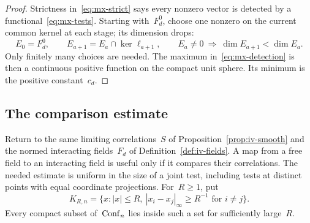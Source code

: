 \begin{proof}
Strictness in~\eqref{eq:mx-strict} says every nonzero vector is detected by a functional~\eqref{eq:mx-tests}. Starting with~$F_d^0$, choose one nonzero on the current common kernel at each stage; its dimension drops:
\begin{equation*}
 E_0=F_d^0,\qquad E_{a+1}=E_a\cap\ker\ell_{a+1},
 \qquad E_a\ne0\ \Longrightarrow\ \dim E_{a+1}<\dim E_a.
\end{equation*}
Only finitely many choices are needed.
The maximum in~\eqref{eq:mx-detection} is then a continuous positive function on the compact unit sphere. Its minimum is the positive constant~$c_d$.
\end{proof}

\subsection{The comparison estimate}\label{subsec:mx-comparison}

Return to the same limiting correlations~$S$ of Proposition~\ref{prop:iv-smooth} and the normed interacting fields~$F_d$ of Definition~\ref{def:iv-fields}.
A map from a free field to an interacting field is useful only if it compares their correlations.
The needed estimate is uniform in the size of a joint test, including tests at distinct points with equal coordinate projections.
For~$R\ge1$, put
\begin{equation}\label{eq:mx-window}
 K_{R,n}=\{x:|x|\le R,\ |x_i-x_j|_\infty\ge R^{-1}\text{ for }i\ne j\}.
\end{equation}
Every compact subset of~$\operatorname{Conf}_{n}$ lies inside such a set for sufficiently large~$R$.

